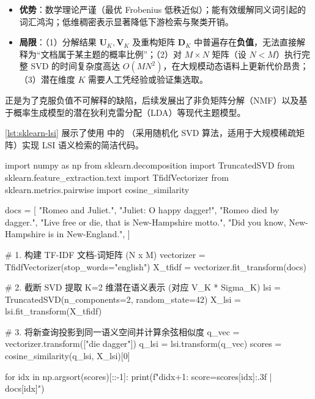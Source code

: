 \begin{method}\label{met:lsi-pros-cons}
\begin{itemize}
  \item \textbf{优势}：数学理论严谨（最优 Frobenius 低秩近似）；能有效缓解同义词引起的词汇鸿沟；低维稠密表示显著降低下游检索与聚类开销。
  \item \textbf{局限}：（1）分解结果 $\mathbf{U}_K, \mathbf{V}_K$ 及重构矩阵 $\mathbf{D}_K$ 中普遍存在\textbf{负值}，无法直接解释为“文档属于某主题的概率比例”；（2）对 $M\times N$ 矩阵（设 $N<M$）执行完整 SVD 的时间复杂度高达 $O(MN^2)$，在大规模动态语料上更新代价昂贵；（3）潜在维度 $K$ 需要人工凭经验或验证集选取。
\end{itemize}
正是为了克服负值不可解释的缺陷，后续发展出了非负矩阵分解（NMF）以及基于概率生成模型的潜在狄利克雷分配（LDA）等现代主题模型。
\end{method}

\cref{lst:sklearn-lsi} 展示了使用  中的 （采用随机化 SVD 算法，适用于大规模稀疏矩阵）实现 LSI 语义检索的简洁代码。

\begin{codeblock}[language=Python, caption={基于 scikit-learn 的 LSI 潜在语义检索实现}, label={lst:sklearn-lsi}]
import numpy as np
from sklearn.decomposition import TruncatedSVD
from sklearn.feature_extraction.text import TfidfVectorizer
from sklearn.metrics.pairwise import cosine_similarity

docs = [
    "Romeo and Juliet.",
    "Juliet: O happy dagger!",
    "Romeo died by dagger.",
    "Live free or die, that is New-Hampshire motto.",
    "Did you know, New-Hampshire is in New-England.",
]

# 1. 构建 TF-IDF 文档-词矩阵 (N x M)
vectorizer = TfidfVectorizer(stop_words="english")
X_tfidf = vectorizer.fit_transform(docs)

# 2. 截断 SVD 提取 K=2 维潜在语义表示 (对应 V_K * Sigma_K)
lsi = TruncatedSVD(n_components=2, random_state=42)
X_lsi = lsi.fit_transform(X_tfidf)

# 3. 将新查询投影到同一语义空间并计算余弦相似度
q_vec = vectorizer.transform(["die dagger"])
q_lsi = lsi.transform(q_vec)
scores = cosine_similarity(q_lsi, X_lsi)[0]

for idx in np.argsort(scores)[::-1]:
    print(f"d{idx+1}: score={scores[idx]:.3f} | {docs[idx]}")
\end{codeblock}

